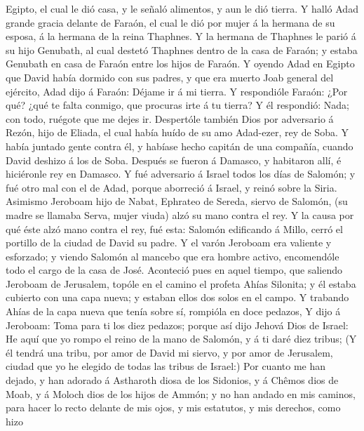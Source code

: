 Egipto, el cual le dió casa, y le señaló alimentos, y aun le dió tierra.
 Y halló Adad grande gracia delante de Faraón, el cual le
dió por mujer á la hermana de su esposa, á la hermana de la reina
Thaphnes.  Y la hermana de Thaphnes le parió á su hijo
Genubath, al cual destetó Thaphnes dentro de la casa de Faraón; y estaba
Genubath en casa de Faraón entre los hijos de Faraón.  Y
oyendo Adad en Egipto que David había dormido con sus padres, y que era
muerto Joab general del ejército, Adad dijo á Faraón: Déjame ir á mi
tierra.  Y respondióle Faraón: ¿Por qué? ¿qué te falta
conmigo, que procuras irte á tu tierra? Y él respondió: Nada; con todo,
ruégote que me dejes ir.  Despertóle también Dios por
adversario á Rezón, hijo de Eliada, el cual había huído de su amo
Adad-ezer, rey de Soba.  Y había juntado gente contra él,
y habíase hecho capitán de una compañía, cuando David deshizo á los de
Soba. Después se fueron á Damasco, y habitaron allí, é hiciéronle rey en
Damasco.  Y fué adversario á Israel todos los días de
Salomón; y fué otro mal con el de Adad, porque aborreció á Israel, y
reinó sobre la Siria.  Asimismo Jeroboam hijo de Nabat,
Ephrateo de Sereda, siervo de Salomón, (su madre se llamaba Serva, mujer
viuda) alzó su mano contra el rey.  Y la causa por qué
éste alzó mano contra el rey, fué esta: Salomón edificando á Millo,
cerró el portillo de la ciudad de David su padre.  Y el
varón Jeroboam era valiente y esforzado; y viendo Salomón al mancebo que
era hombre activo, encomendóle todo el cargo de la casa de José.
 Aconteció pues en aquel tiempo, que saliendo Jeroboam de
Jerusalem, topóle en el camino el profeta Ahías Silonita; y él estaba
cubierto con una capa nueva; y estaban ellos dos solos en el campo.
 Y trabando Ahías de la capa nueva que tenía sobre sí,
rompióla en doce pedazos,  Y dijo á Jeroboam: Toma para
ti los diez pedazos; porque así dijo Jehová Dios de Israel: He aquí que
yo rompo el reino de la mano de Salomón, y á ti daré diez tribus;
 (Y él tendrá una tribu, por amor de David mi siervo, y
por amor de Jerusalem, ciudad que yo he elegido de todas las tribus de
Israel:)  Por cuanto me han dejado, y han adorado á
Astharoth diosa de los Sidonios, y á Chêmos dios de Moab, y á Moloch
dios de los hijos de Ammón; y no han andado en mis caminos, para hacer
lo recto delante de mis ojos, y mis estatutos, y mis derechos, como hizo
